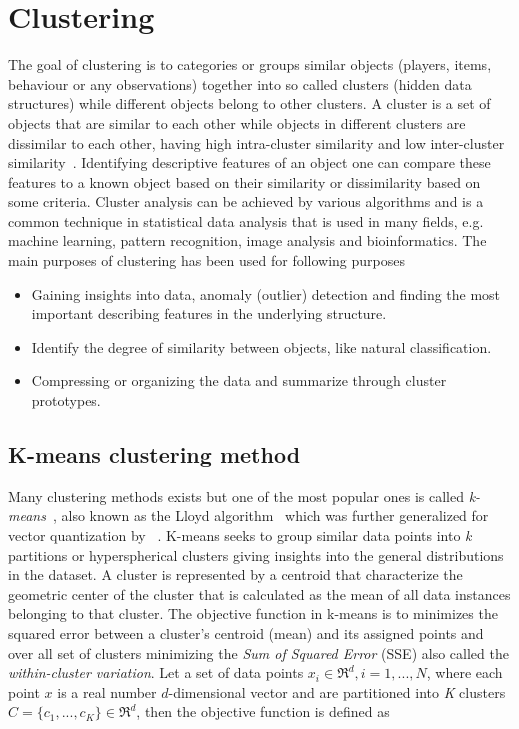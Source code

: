 \section{Clustering}
The goal of clustering is to categories or groups similar objects (players, items, behaviour or any observations) together into so called clusters (hidden data structures) while different objects belong to other clusters. A cluster is a set of objects that are similar to each other while objects in different clusters are dissimilar to each other, having high intra-cluster similarity and low inter-cluster similarity~\citep{Xu:2009Clu}. Identifying descriptive features of an object one can compare these features to a known object based on their similarity or dissimilarity based on some criteria. Cluster analysis can be achieved by various algorithms and is a common technique in statistical data analysis that is used in many fields, e.g. machine learning, pattern recognition, image analysis and bioinformatics. The main purposes of clustering has been used for following purposes
\begin{itemize}
\item Gaining insights into data, anomaly (outlier) detection and finding the most important describing features in the underlying structure.
\item Identify the degree of similarity between objects, like natural classification.
\item Compressing or organizing the data and summarize through cluster prototypes.
\end{itemize}

\subsection{K-means clustering method}
\label{subsec:kmeansclustering}
Many clustering methods exists but one of the most popular ones is called \textit{k-means}~\citep{FORGYE.W.:1965,MacQueen:1967KMeans}, also known as the Lloyd algorithm~\citep{Lloyd:1982} which was further generalized for vector quantization by ~\citep{Linde:1980VQ,Gersho:1991VQS,Xu:2009Clu}. K-means seeks to group similar data points into \textit{k} partitions or hyperspherical clusters giving insights into the general distributions in the dataset. A cluster is represented by a centroid that characterize the geometric center of the cluster that is calculated as the mean of all data instances belonging to that cluster. The objective function in k-means is to minimizes the squared error between a cluster's centroid (mean) and its assigned points and over all set of clusters minimizing the \textit{Sum of Squared Error} (SSE) also called the \textit{within-cluster variation}. Let a set of data points $x_i \in \Re^d, i=1,...,N$, where each point $x$ is a real number $d$-dimensional vector and are partitioned into \textit{K} clusters $C=\{c_1,...,c_K\} \in \Re^d$, then the objective function is defined as


